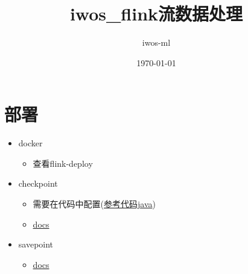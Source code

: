 \documentclass[11pt]{article}
\author{iwos-ml}
\date{\today}
\title{iwos\_flink流数据处理}
\begin{document}
\maketitle
\tableofcontents

\section{部署}
\label{sec-1}
\begin{itemize}
\item docker
\begin{itemize}
\item 查看flink-deploy
\end{itemize}
\item checkpoint
\begin{itemize}
\item 需要在代码中配置(\href{https://github.com/apache/flink-playgrounds/blob/master/docker/ops-playground-image/java/flink-playground-clickcountjob/src/main/java/org/apache/flink/playgrounds/ops/clickcount/ClickEventCount.java}{参考代码java})
\item \href{https://ci.apache.org/projects/flink/flink-docs-release-1.9/zh/ops/state/checkpoints.html}{docs}
\end{itemize}
\item savepoint
\begin{itemize}
\item \href{https://ci.apache.org/projects/flink/flink-docs-release-1.9/zh/ops/state/savepoints.html}{docs}
\end{itemize}
\end{itemize}
\end{document}
